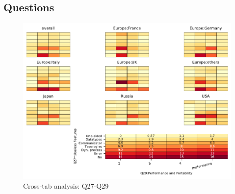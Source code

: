 
\subsection{Questions}


\begin{figure}
\begin{center}
\includegraphics[width=12cm]{../pdfs/Q27-Q29.pdf}
\caption{Cross-tab analysis: Q27-Q29}
\label{fig:Q27-Q29}
\end{center}
\end{figure}
